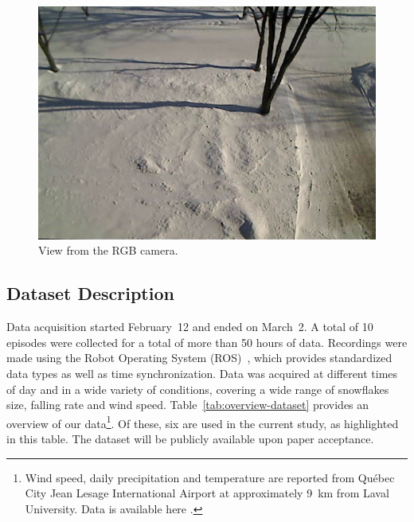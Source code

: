 \begin{figure}[h]
    \centering
    \includegraphics[width=0.90\linewidth]{./img/chap_lidar/camera_view.jpg}
    \caption{View from the RGB camera.}
    \label{fig:view}
\end{figure}

\subsection{Dataset Description}
Data acquisition started February~12 and ended on March~2. A total of 10 episodes were collected for a total of more than 50 hours of data. Recordings were made using the Robot Operating System (ROS)~\cite{ROSWeb}, which provides standardized data types as well as time synchronization. Data was acquired at different times of day and in a wide variety of conditions, covering a wide range of snowflakes size, falling rate and wind speed.  Table~\ref{tab:overview-dataset} provides an overview of our data\footnote{Wind speed, daily precipitation and temperature are reported from Québec City Jean Lesage International Airport at approximately \SI{9}{\km} from Laval University. Data is available here \cite{WeatherCanada}.}. Of these, six are used in the current study, as highlighted in this table. The dataset will be publicly available upon paper acceptance. %

